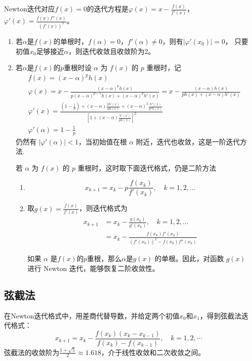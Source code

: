 Newton迭代对应\(f(x)=0\)的迭代方程是\(\varphi(x)=x-\frac{f(x)}{f'(x)}\)，\(\displaystyle\varphi'(x)=\frac{f(x)f''(x)}{(f'(x))^2}\)。
\begin{enumerate}
    \item 若\(\alpha\)是\(f(x)\)的单根时，\(f(\alpha)=0\text{，}f'(\alpha)\neq 0\)，则有\(|\varphi'(x_0)|=0\)，
    只要初值\(x_0\)足够接近\(\alpha\)，则迭代收敛且收敛阶为2。
    \item 若\(\alpha\)是\(f(x)\)的\(p\)重根时设 \(\alpha\) 为 \(f(x)\) 的 \(p\) 重根时，记
\begin{gather*}
f(x) = (x - \alpha)^p h(x) \\
\varphi(x) = x - \frac{(x - \alpha)^p h(x)}{p(x - \alpha)^{p-1}h(x) + (x - \alpha)^p h'(x)} = x - \frac{(x - \alpha)h(x)}{ph(x) + (x - \alpha)h'(x)} \\
\varphi'(x) = \frac{\left( 1 - \frac{1}{p} \right) + (x - \alpha)\frac{2h'(x)}{ph(x)} + (x - \alpha)^2\frac{h''(x)}{p^2h(x)}}
{\left[ 1 + (x - \alpha)\frac{h'(x)}{ph(x)} \right]^2 }\\
\varphi'(\alpha) = 1 - \frac{1}{p}
\end{gather*}
仍然有 \(|\varphi'(\alpha)| < 1\)，当初始值在根 \(\alpha\) 附近，迭代也收敛，这是一阶迭代方法.

若 \(\alpha\) 为 \(f(x)\) 的 \(p\) 重根时，这时取下面迭代格式，仍是二阶方法
\begin{enumerate}
    \item \[
x_{k+1} = x_k - p\frac{f(x_k)}{f'(x_k)}, \quad k = 1, 2, \ldots
\]
    \item 取\(g(x) = \frac{f(x)}{f'(x)}\)，则迭代格式为
    \begin{align*}
        x_{k+1} &= x_k - \frac{g(x_k)}{g'(x_k)}, \quad k = 1, 2, \ldots\\
    &=x_k-\frac{f(x_k)f'(x_k)}{(f'(x_k))^2 - f(x_k)f''(x_k)}
    \end{align*}
    \begin{note}
        如果 \(\alpha\) 是\(f(x) \)的\(p\)重根，那么\(\alpha\)是\(g(x)\) 的单根。因此，对函数 \(g(x)\) 进行 Newton 迭代，能够恢复二阶收敛性。
    \end{note}
\end{enumerate}

\end{enumerate}
\subsection{弦截法}
在Newton迭代格式中，用差商代替导数，并给定两个初值\(x_0\)和\(x_1\)，得到弦截法迭代格式：
\[x_{k+1}=x_k -\frac{f(x_k)(x_k - x_{k-1})}{f(x_k)-f(x_{k-1})},\quad k=1,2,\cdots\]
弦截法的收敛阶为\(\frac{1+\sqrt{5}}{2}\approx 1.618\)，介于线性收敛和二次收敛之间。
